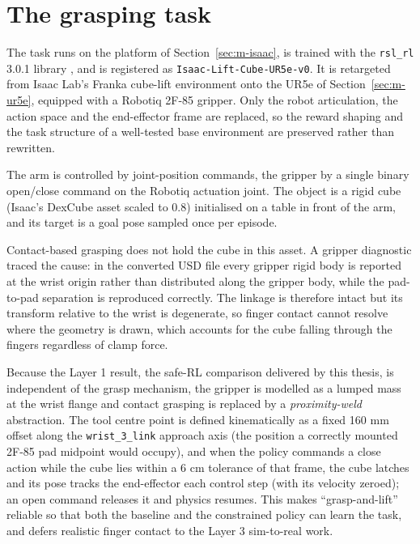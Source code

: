 \section{The grasping task}\label{sec:m-env}

The task runs on the platform of Section~\ref{sec:m-isaac}, is trained with the \texttt{rsl\_rl}
3.0.1 library \cite{rudin2022walk}, and is registered as \texttt{Isaac-Lift-Cube-UR5e-v0}. It is
retargeted from Isaac Lab's Franka cube-lift environment onto the UR5e of
Section~\ref{sec:m-ur5e}, equipped with a Robotiq 2F-85 gripper. Only the robot articulation, the
action space and the end-effector frame are replaced, so the reward shaping and the task structure
of a well-tested base environment are preserved rather than rewritten.

The arm is controlled by joint-position commands, the gripper by a single binary open/close command
on the Robotiq actuation joint. The object is a rigid cube (Isaac's DexCube asset scaled to 0.8)
initialised on a table in front of the arm, and its target is a goal pose sampled once per episode.

Contact-based grasping does not hold the cube in this asset. A gripper diagnostic traced the cause:
in the converted USD file every gripper rigid body is reported at the wrist origin rather than
distributed along the gripper body, while the pad-to-pad separation is reproduced correctly. The
linkage is therefore intact but its transform relative to the wrist is degenerate, so finger contact
cannot resolve where the geometry is drawn, which accounts for the cube falling through the fingers
regardless of clamp force.

Because the Layer 1 result, the safe-RL comparison delivered by this thesis, is independent of the
grasp mechanism, the gripper is
modelled as a lumped mass at the wrist flange and contact grasping is replaced by a \emph{proximity-weld}
abstraction. The tool centre point is defined kinematically as a fixed 160 mm offset along the
\texttt{wrist\_3\_link} approach axis (the position a correctly mounted 2F-85 pad midpoint would occupy),
and when the policy commands a close action while the cube lies within a 6 cm tolerance of that
frame, the cube latches and its pose tracks the end-effector each control step (with its velocity
zeroed); an open command releases it and physics resumes. This makes ``grasp-and-lift'' reliable so
that both the baseline and the constrained policy can learn the task, and defers realistic finger
contact to the Layer 3 sim-to-real work.

